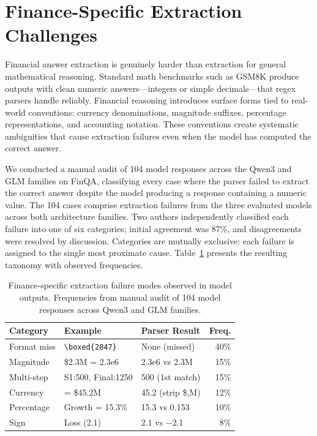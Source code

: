 \section{Finance-Specific Extraction Challenges}
\label{sec:finance_challenges}

Financial answer extraction is genuinely harder than extraction for general mathematical reasoning. Standard math benchmarks such as GSM8K produce outputs with clean numeric answers---integers or simple decimals---that regex parsers handle reliably. Financial reasoning introduces surface forms tied to real-world conventions: currency denominations, magnitude suffixes, percentage representations, and accounting notation. These conventions create systematic ambiguities that cause extraction failures even when the model has computed the correct answer.

We conducted a manual audit of 104 model responses across the Qwen3 and GLM families on FinQA, classifying every case where the \numparser{} parser failed to extract the correct answer despite the model producing a response containing a numeric value. The 104 cases comprise extraction failures from the three evaluated models across both architecture families. Two authors independently classified each failure into one of six categories; initial agreement was 87\%, and disagreements were resolved by discussion. Categories are mutually exclusive: each failure is assigned to the single most proximate cause. Table~\ref{tab:taxonomy} presents the resulting taxonomy with observed frequencies.

\begin{table}[htb!]
\caption{Finance-specific extraction failure modes observed in model outputs. Frequencies from manual audit of 104 model responses across Qwen3 and GLM families.}
\label{tab:taxonomy}
\centering
\footnotesize
\begin{tabular}{@{}lllr@{}}
\toprule
Category & Example & Parser Result & Freq. \\
\midrule
Format miss & \verb|\boxed{2847}| & None (missed) & 40\% \\
Magnitude & \$2.3M = 2.3e6 & 2.3e6 vs 2.3M & 15\% \\
Multi-step & S1:500, Final:1250 & 500 (1st match) & 15\% \\
Currency & = \$45.2M & 45.2 (strip \$,M) & 12\% \\
Percentage & Growth = 15.3\% & 15.3 vs 0.153 & 10\% \\
Sign & Loss (2.1) & 2.1 vs $-$2.1 & 8\% \\
\bottomrule
\end{tabular}
\end{table}

